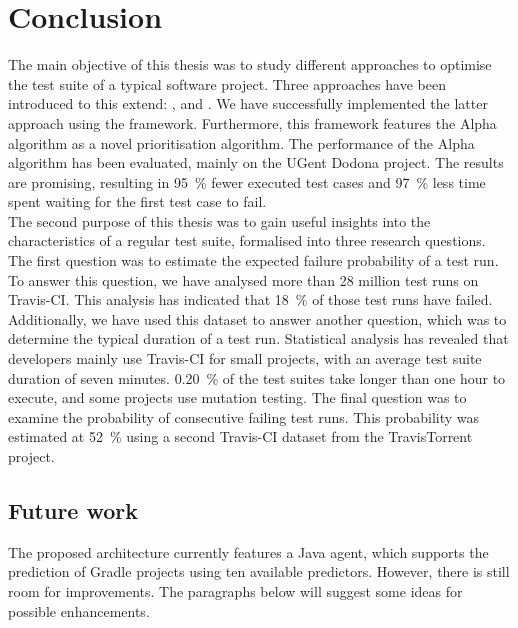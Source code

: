 
\chapter{Conclusion}
\label{ch:conclusion}

The main objective of this thesis was to study different approaches to optimise the test suite of a typical software project. Three approaches have been introduced to this extend: \tsm{}, \tcs{} and \tcp{}. We have successfully implemented the latter approach using the \velocity{} framework. Furthermore, this framework features the Alpha algorithm as a novel prioritisation algorithm. The performance of the Alpha algorithm has been evaluated, mainly on the UGent Dodona project. The results are promising, resulting in \SI{95}{\percent} fewer executed test cases and \SI{97}{\percent} less time spent waiting for the first test case to fail.\\

\noindent The second purpose of this thesis was to gain useful insights into the characteristics of a regular test suite, formalised into three research questions. The first question was to estimate the expected failure probability of a test run. To answer this question, we have analysed more than 28 million test runs on Travis-CI. This analysis has indicated that \SI{18}{\percent} of those test runs have failed. Additionally, we have used this dataset to answer another question, which was to determine the typical duration of a test run. Statistical analysis has revealed that developers mainly use Travis-CI for small projects, with an average test suite duration of seven minutes. \SI{0.20}{\percent} of the test suites take longer than one hour to execute, and some projects use mutation testing. The final question was to examine the probability of consecutive failing test runs. This probability was estimated at \SI{52}{\percent} using a second Travis-CI dataset from the TravisTorrent project\cite{msr17challenge}.

\clearpage

\section{Future work}
The proposed architecture currently features a Java agent, which supports the prediction of Gradle projects using ten available predictors. However, there is still room for improvements. The paragraphs below will suggest some ideas for possible enhancements.

